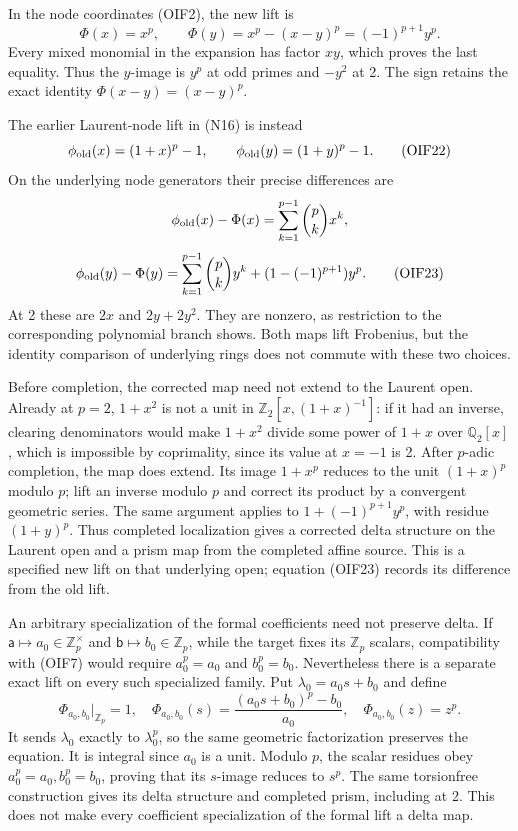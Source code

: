 \documentclass[
]{article}
\begin{document}
In the node coordinates (OIF2), the new lift is \[
\Phi(x)=x^p,\qquad
\Phi(y)=x^p-(x-y)^p=(-1)^{p+1}y^p.
\tag{OIF21}
\] Every mixed monomial in the expansion has factor \(xy\), which proves
the last equality. Thus the \(y\)-image is \(y^p\) at odd primes and
\(-y^2\) at 2. The sign retains the exact identity
\(\Phi(x-y)=(x-y)^p\).

The earlier Laurent-node lift in (N16) is instead \[
\phi_{\rm old}(x)=(1+x)^p-1,\qquad
\phi_{\rm old}(y)=(1+y)^p-1.
\tag{OIF22}
\] On the underlying node generators their precise differences are \[
\phi_{\rm old}(x)-\Phi(x)
=\sum_{k=1}^{p-1}\binom pkx^k,
\] \[
\phi_{\rm old}(y)-\Phi(y)
=\sum_{k=1}^{p-1}\binom pky^k
+(1-(-1)^{p+1})y^p.
\tag{OIF23}
\] At 2 these are \(2x\) and \(2y+2y^2\). They are nonzero, as
restriction to the corresponding polynomial branch shows. Both maps lift
Frobenius, but the identity comparison of underlying rings does not
commute with these two choices.

Before completion, the corrected map need not extend to the Laurent
open. Already at \(p=2\), \(1+x^2\) is not a unit in
\(\mathbb Z_2[x,(1+x)^{-1}]\): if it had an inverse, clearing
denominators would make \(1+x^2\) divide some power of \(1+x\) over
\(\mathbb Q_2[x]\), which is impossible by coprimality, since its value
at \(x=-1\) is 2. After \(p\)-adic completion, the map does extend. Its
image \(1+x^p\) reduces to the unit \((1+x)^p\) modulo \(p\); lift an
inverse modulo \(p\) and correct its product by a convergent geometric
series. The same argument applies to \(1+(-1)^{p+1}y^p\), with residue
\((1+y)^p\). Thus completed localization gives a corrected delta
structure on the Laurent open and a prism map from the completed affine
source. This is a specified new lift on that underlying open; equation
(OIF23) records its difference from the old lift.

An arbitrary specialization of the formal coefficients need not preserve
delta. If \(\mathsf a\mapsto a_0\in\mathbb Z_p^\times\) and
\(\mathsf b\mapsto b_0\in\mathbb Z_p\), while the target fixes its
\(\mathbb Z_p\) scalars, compatibility with (OIF7) would require
\(a_0^p=a_0\) and \(b_0^p=b_0\). Nevertheless there is a separate exact
lift on every such specialized family. Put \(\lambda_0=a_0s+b_0\) and
define \[
\Phi_{a_0,b_0}|_{\mathbb Z_p}=1,\quad
\Phi_{a_0,b_0}(s)=\frac{(a_0s+b_0)^p-b_0}{a_0},\quad
\Phi_{a_0,b_0}(z)=z^p.
\tag{OIF24}
\] It sends \(\lambda_0\) exactly to \(\lambda_0^p\), so the same
geometric factorization preserves the equation. It is integral since
\(a_0\) is a unit. Modulo \(p\), the scalar residues obey
\(a_0^p=a_0,b_0^p=b_0\), proving that its \(s\)-image reduces to
\(s^p\). The same torsionfree construction gives its delta structure and
completed prism, including at 2. This does not make every coefficient
specialization of the formal lift a delta map.
\end{document}
